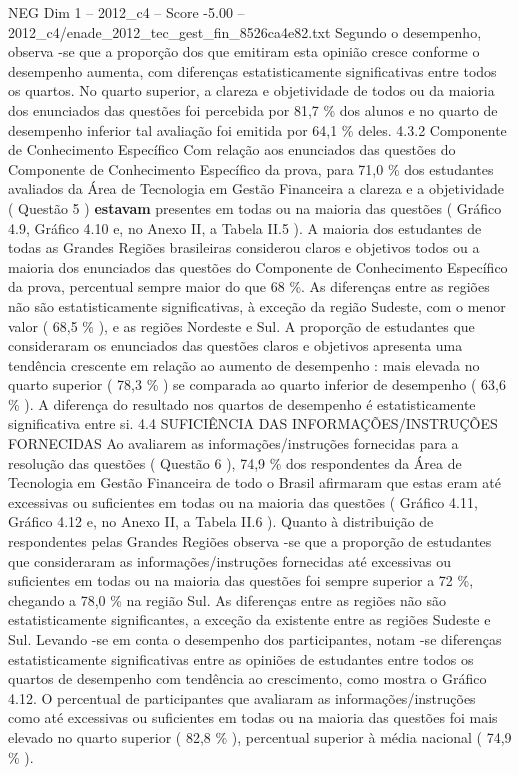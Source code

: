 \begin{textsample}{NEG Dim 1 – 2012\_c4 – Score -5.00 – 2012\_c4/enade\_2012\_tec\_gest\_fin\_8526ca4e82.txt}
Segundo o desempenho, observa -se que a proporção dos que emitiram esta opinião cresce conforme o desempenho aumenta, com diferenças estatisticamente significativas entre todos os quartos.
No quarto superior, a clareza e objetividade de todos ou da maioria dos enunciados das questões foi percebida por 81,7 \% dos alunos e no quarto de desempenho inferior tal avaliação foi emitida por 64,1 \% deles. 4.3.2 Componente de Conhecimento Específico Com relação aos enunciados das questões do Componente de Conhecimento Específico da prova, para 71,0 \% dos estudantes avaliados da Área de Tecnologia em Gestão Financeira a clareza e a objetividade ( Questão 5 ) \textbf{estavam} presentes em todas ou na maioria das questões ( Gráfico 4.9, Gráfico 4.10 e, no Anexo II, a Tabela II.5 ).
A maioria dos estudantes de todas as Grandes Regiões brasileiras considerou claros e objetivos todos ou a maioria dos enunciados das questões do Componente de Conhecimento Específico da prova, percentual sempre maior do que 68 \%.
As diferenças entre as regiões não são estatisticamente significativas, à exceção da região Sudeste, com o menor valor ( 68,5 \% ), e as regiões Nordeste e Sul.
A proporção de estudantes que consideraram os enunciados das questões claros e objetivos apresenta uma tendência crescente em relação ao aumento de desempenho : mais elevada no quarto superior ( 78,3 \% ) se comparada ao quarto inferior de desempenho ( 63,6 \% ).
A diferença do resultado nos quartos de desempenho é estatisticamente significativa entre si. 4.4 SUFICIÊNCIA DAS INFORMAÇÕES/INSTRUÇÕES FORNECIDAS Ao avaliarem as informações/instruções fornecidas para a resolução das questões ( Questão 6 ), 74,9 \% dos respondentes da Área de Tecnologia em Gestão Financeira de todo o Brasil afirmaram que estas eram até excessivas ou suficientes em todas ou na maioria das questões ( Gráfico 4.11, Gráfico 4.12 e, no Anexo II, a Tabela II.6 ).
Quanto à distribuição de respondentes pelas Grandes Regiões observa -se que a proporção de estudantes que consideraram as informações/instruções fornecidas até excessivas ou suficientes em todas ou na maioria das questões foi sempre superior a 72 \%, chegando a 78,0 \% na região Sul.
As diferenças entre as regiões não são estatisticamente significantes, a exceção da existente entre as regiões Sudeste e Sul.
Levando -se em conta o desempenho dos participantes, notam -se diferenças estatisticamente significativas entre as opiniões de estudantes entre todos os quartos de desempenho com tendência ao crescimento, como mostra o Gráfico 4.12.
O percentual de participantes que avaliaram as informações/instruções como até excessivas ou suficientes em todas ou na maioria das questões foi mais elevado no quarto superior ( 82,8 \% ), percentual superior à média nacional ( 74,9 \% ).

\end{textsample}
